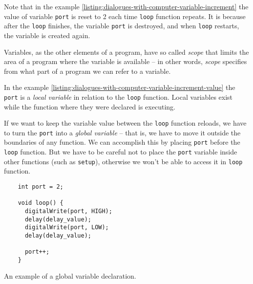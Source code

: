 \documentclass[../sparc.tex]{subfiles}
\begin{document}
Note that in the example
\ref{listing:dialogues-with-computer-variable-increment} the value of variable
\texttt{port} is reset to 2 each time \texttt{loop} function repeats.  It is
because after the \texttt{loop} finishes, the variable \texttt{port} is
destroyed, and when \texttt{loop} restarts, the variable is created again.

Variables, as the other elements of a program, have so called \emph{scope} that
limits the area of a program where the variable is available -- in other words,
\emph{scope} specifies from what part of a program we can refer to a variable.

In the example \ref{listing:dialogues-with-computer-variable-increment-value}
the \texttt{port} is a \emph{local variable} in relation to the \texttt{loop}
function.  Local variables exist while the function where they were declared is
executing.

 If we want to keep the variable
value between the \texttt{loop} function reloads, we have to turn the
\texttt{port} into a \emph{global variable} -- that is, we have to move it
outside the boundaries of any function.  We can accomplish this by placing
\texttt{port} before the \texttt{loop} function.  But we have to be careful not
to place the \texttt{port} variable inside other functions (such as
\texttt{setup}), otherwise we won't be able to access it in \texttt{loop}
function.

\begin{listing}[ht]
  \begin{verbatim}
    int port = 2;

    void loop() {
      digitalWrite(port, HIGH);
      delay(delay_value);
      digitalWrite(port, LOW);
      delay(delay_value);

      port++;
    }
  \end{verbatim}
  \label{listing:dialogues-with-computer-global-variable}
  \caption{An example of a global variable declaration.}
\end{listing}
\end{document}

